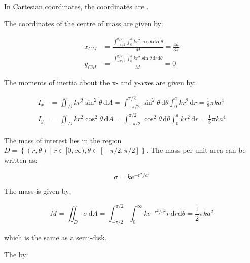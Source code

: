 \documentclass[12pt]{article}
\begin{document}
In Cartesian coordinates, the coordinates are .

\begin{correction}
    The coordinates of the centre of mass are given by:

    \begin{equation}
        \begin{split}
            x_{CM} &= \frac{\int_{-\pi/2}^{\pi/2} \int_{0}^{a} k r^{2} \cos{\theta} \, \mathrm{d}r \mathrm{d}\theta}{M} = \frac{4a}{3\pi} \\
            y_{CM} &= \frac{\int_{-\pi/2}^{\pi/2} \int_{0}^{a} k r^{2} \sin{\theta} \, \mathrm{d}r \mathrm{d}\theta}{M} = 0
        \end{split}
    \end{equation}
\end{correction}

The moments of inertia about the x- and y-axes are given by:

\begin{equation}
    \begin{split}
        I_{x} &= \iint_{D} k r^{2} \sin^{2}{\theta} \, \mathrm{d}A = \int_{-\pi/2}^{\pi/2} \sin^{2}{\theta} \, \mathrm{d}\theta \int_{0}^{a} k r^{2} \, \mathrm{d}r = \frac{1}{8} \pi k a^{4} \\
        I_{y} &= \iint_{D} k r^{2} \cos^{2}{\theta} \, \mathrm{d}A = \int_{-\pi/2}^{\pi/2} \cos^{2}{\theta} \, \mathrm{d}\theta \int_{0}^{a} k r^{2} \, \mathrm{d}r = \frac{1}{8} \pi k a^{4}
    \end{split}
\end{equation}

The mass of interest lies in the region $D = \left\{ (r, \theta) \mid r \in [0, \infty), \theta \in [-\pi/2, \pi/2] \right\}$. The mass per unit area can be written as:

\begin{equation}
    \sigma = k e^{-r^{2}/a^{2}}
\end{equation}

The mass is given by:

\begin{equation}
    M = \iint_{D} \sigma \, \mathrm{d}A = \int_{-\pi/2}^{\pi/2} \int_{0}^{\infty} k e^{-r^{2}/a^{2}} r \, \mathrm{d}r \mathrm{d}\theta = \frac{1}{2} \pi k a^{2}
\end{equation}

which is the same as a semi-disk.

The  by:
\end{document}
